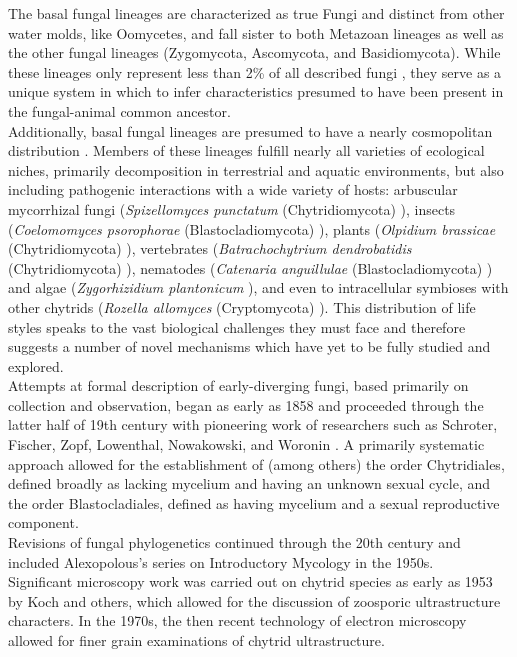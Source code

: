 \indent The basal fungal lineages are characterized as true Fungi and distinct from other water molds, like Oomycetes, and fall sister to both Metazoan lineages as well as the other fungal lineages (Zygomycota, Ascomycota, and Basidiomycota). While these lineages only represent less than 2\% of all described fungi \cite{Stajich2009}, they serve as a unique system in which to infer characteristics presumed to have been present in the fungal-animal common ancestor.\\
\indent Additionally, basal fungal lineages are presumed to have a nearly cosmopolitan distribution \cite{Powell1993}. Members of these lineages fulfill nearly all varieties of ecological niches, primarily decomposition in terrestrial and aquatic environments, but also including pathogenic interactions with a wide variety of hosts: arbuscular mycorrhizal fungi (\textit{Spizellomyces punctatum} (Chytridiomycota) \cite{Paulitz1984}), insects (\textit{Coelomomyces psorophorae} (Blastocladiomycota) \cite{Zebold1979}), plants (\textit{Olpidium brassicae} (Chytridiomycota) \cite{Tewari1983}), vertebrates (\textit{Batrachochytrium dendrobatidis} (Chytridiomycota) \cite{Longcore1999}), nematodes (\textit{Catenaria anguillulae} (Blastocladiomycota) \cite{Deacon1997}) and algae (\textit{Zygorhizidium plantonicum} \cite{Canter1967}), and even to intracellular symbioses with other chytrids (\textit{Rozella allomyces} (Cryptomycota) \cite{Held1973}). This distribution of life styles speaks to the vast biological challenges they must face and therefore suggests a number of novel mechanisms which have yet to be fully studied and explored. \\
\indent Attempts at formal description of early-diverging fungi, based primarily on collection and observation, began as early as 1858 and proceeded through the latter half of 19th century with pioneering work of researchers such as Schroter, Fischer, Zopf, Lowenthal, Nowakowski, and Woronin \cite{Fitzpatrick1930}. A primarily systematic approach allowed for the establishment of (among others) the order Chytridiales, defined broadly as lacking mycelium and having an unknown sexual cycle, and the order Blastocladiales, defined as having mycelium and a sexual reproductive component.\\
\indent Revisions of fungal phylogenetics continued through the 20th century and included Alexopolous's series on Introductory Mycology in the 1950s.\\
\indent Significant microscopy work was carried out on chytrid species as early as 1953 by Koch and others, which allowed for the discussion of zoosporic ultrastructure characters. In the 1970s, the then recent technology of electron microscopy allowed for finer grain examinations of chytrid ultrastructure.\\
